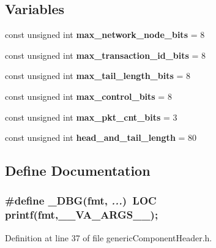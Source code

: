 \subsection*{Variables}
\begin{CompactItemize}
\item 
const unsigned int {\bf max\_\-network\_\-node\_\-bits} = 8
\item 
const unsigned int {\bf max\_\-transaction\_\-id\_\-bits} = 8
\item 
const unsigned int {\bf max\_\-tail\_\-length\_\-bits} = 8
\item 
const unsigned int {\bf max\_\-control\_\-bits} = 8
\item 
const unsigned int {\bf max\_\-pkt\_\-cnt\_\-bits} = 3
\item 
const unsigned int {\bf head\_\-and\_\-tail\_\-length} = 80
\end{CompactItemize}


\subsection{Define Documentation}
\subsubsection[{\_\-DBG}]{\setlength{\rightskip}{0pt plus 5cm}\#define \_\-DBG(fmt, \/   {\em ...})~LOC printf(fmt,\_\-\_\-VA\_\-ARGS\_\-\_\-);}\label{genericComponentHeader_8h_db8be0abb314b4cd0da20a9aa45a473e}




Definition at line 37 of file genericComponentHeader.h.

